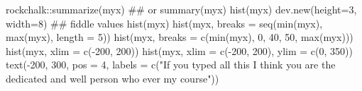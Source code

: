 \begin{Schunk}
\begin{Sinput}
 rockchalk::summarize(myx) ## or summary(myx)
 hist(myx)
 dev.new(height=3, width=8) ## fiddle values
 hist(myx)
 hist(myx, breaks = seq(min(myx), max(myx), length = 5))
 hist(myx, breaks = c(min(myx), 0, 40, 50, max(myx)))
 hist(myx, xlim = c(-200, 200))
 hist(myx, xlim = c(-200, 200), ylim = c(0, 350))
 text(-200, 300, pos = 4, labels = c("If you typed all this \nin I think you are the \nmost dedicated and well \nadjusted person who ever \ntook my course"))
\end{Sinput}
\end{Schunk}
